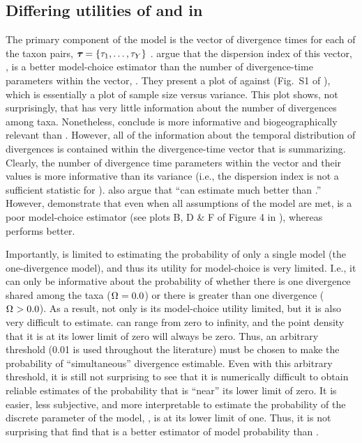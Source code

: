 \subsection*{Differing utilities of \numt{} and \vmratio{} in \msb}
The primary component of the \msb model is the vector of divergence
times for each of the taxon pairs,
$\boldsymbol{\tau_{}} = \{\tau_{1}, \ldots, \tau_{Y}\}$
\citep{Oaks2012}.
\citet{Hickerson2013} argue that the dispersion index of this vector,
\vmratio{}, is a better model-choice estimator than the number of 
divergence-time parameters within the vector,
\numt{}.
They present a plot of \numt{} against \vmratio{} (Fig.~S1 of
\citet{Hickerson2013}), which is essentially a plot of sample size versus
variance.
This plot shows, not surprisingly, that \vmratio{} has very little information
about the number of divergences among taxa.
Nonetheless, \citet{Hickerson2013} conclude \vmratio{} is more informative and
biogeographically relevant than \numt{}.
However, all of the information about the temporal distribution of divergences
is contained within the divergence-time vector that \vmratio{} is summarizing.
Clearly, the number of divergence time parameters within the vector and their
values is more informative than its variance (i.e., the dispersion index is not
a sufficient statistic for \divtvector).
\citet{Hickerson2013} also argue that ``\msb can estimate \vmratio{} much
better than \numt{}.''
However, \citet{Oaks2012} demonstrate that even when all assumptions of the
model are met, \vmratio{} is a poor model-choice estimator (see plots B, D \& F
of Figure 4 in \citet{Oaks2012}), whereas \numt{} performs better.

Importantly, \vmratio{} is limited to estimating the probability of only a
single model (the one-divergence model), and thus its utility for model-choice
is very limited.
I.e., it can only be informative about the probability of whether there is one
divergence shared among the taxa ($\Omega_{} = 0.0$) or there is greater than
one divergence ($\Omega_{} > 0.0$).
As a result, not only is its model-choice utility limited, but it is also
very difficult to estimate.
\vmratio{} can range from zero to infinity, and the point density that it is
at its lower limit of zero will always be zero.
Thus, an arbitrary threshold (0.01 is used throughout the \msb literature) must
be chosen to make the probability of ``simultaneous'' divergence estimable.
Even with this arbitrary threshold, it is still not surprising to see that it
is numerically difficult to obtain reliable estimates of the probability that
\vmratio{} is ``near'' its lower limit of zero.
It is easier, less subjective, and more interpretable to estimate the
probability of the discrete parameter of the model, \numt{}, is at its lower
limit of one.
Thus, it is not surprising that \citet{Oaks2012} find that \numt{} is a better
estimator of model probability than \vmratio{}.

